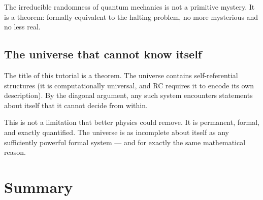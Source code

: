 \documentclass[11pt,a4paper]{article}
\begin{document}
The irreducible randomness of quantum mechanics is not a primitive mystery.  It is a
theorem: formally equivalent to the halting problem, no more mysterious and no less real.

\subsection{The universe that cannot know itself}

The title of this tutorial is a theorem.  The universe contains self-referential
structures (it is computationally universal, and RC requires it to encode its own
description).  By the diagonal argument, any such system encounters statements about
itself that it cannot decide from within.

This is not a limitation that better physics could remove.  It is permanent, formal,
and exactly quantified.  The universe is as incomplete about itself as any
sufficiently powerful formal system — and for exactly the same mathematical reason.

\section*{Summary}
\end{document}
